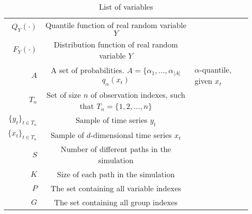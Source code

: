 \begin{table}[htbp]\caption*{List of variables}
\begin{center}%
\begin{tabular}{r c p{10cm} }
\toprule
$Q_Y(\cdot)$ & Quantile function of real random variable $Y$ \\
$F_Y(\cdot)$ & Distribution function of real random variable $Y$ \\
$A$ & A set of probabilities. $A = \{\alpha_1, \dots, \alpha_{|A|}$
$q_\alpha(x_t)$ & $\alpha$-quantile, given $x_t$ \\
$T_n$ & Set of size $n$ of observation indexes, such that $T_n = \{1, 2, \dots, n\}$ \\
$\{y_t\}_{t \in T_n}$ & Sample of time series $y_t$  \\
$\{x_t\}_{t \in T_n}$ & Sample of $d$-dimensional time series $x_t$  \\
$S$ & Number of different paths in the simulation \\
$K$ & Size of each path in the simulation \\
$P$ & The set containing all variable indexes \\
$G$ & The set containing all group indexes \\


\bottomrule
\end{tabular}
\end{center}
\label{tab:TableOfNotationForMyResearch}
\end{table}
